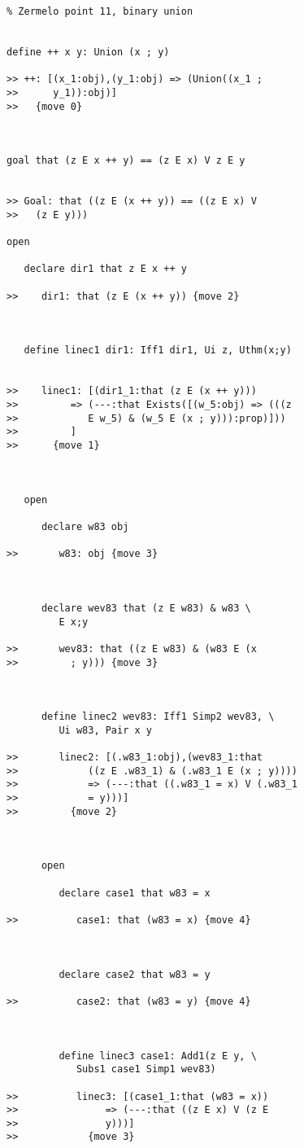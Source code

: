 \documentclass[12pt]{article}
\begin{document}
\begin{verbatim}
% Zermelo point 11, binary union


define ++ x y: Union (x ; y)

>> ++: [(x_1:obj),(y_1:obj) => (Union((x_1 ;
>>      y_1)):obj)]
>>   {move 0}



goal that (z E x ++ y) == (z E x) V z E y


>> Goal: that ((z E (x ++ y)) == ((z E x) V
>>   (z E y)))

open

   declare dir1 that z E x ++ y

>>    dir1: that (z E (x ++ y)) {move 2}



   define linec1 dir1: Iff1 dir1, Ui z, Uthm(x;y)


>>    linec1: [(dir1_1:that (z E (x ++ y)))
>>         => (---:that Exists([(w_5:obj) => (((z
>>            E w_5) & (w_5 E (x ; y))):prop)]))
>>         ]
>>      {move 1}



   open

      declare w83 obj

>>       w83: obj {move 3}



      declare wev83 that (z E w83) & w83 \
         E x;y

>>       wev83: that ((z E w83) & (w83 E (x
>>         ; y))) {move 3}



      define linec2 wev83: Iff1 Simp2 wev83, \
         Ui w83, Pair x y

>>       linec2: [(.w83_1:obj),(wev83_1:that
>>            ((z E .w83_1) & (.w83_1 E (x ; y))))
>>            => (---:that ((.w83_1 = x) V (.w83_1
>>            = y)))]
>>         {move 2}



      open

         declare case1 that w83 = x

>>          case1: that (w83 = x) {move 4}



         declare case2 that w83 = y

>>          case2: that (w83 = y) {move 4}



         define linec3 case1: Add1(z E y, \
            Subs1 case1 Simp1 wev83)

>>          linec3: [(case1_1:that (w83 = x))
>>               => (---:that ((z E x) V (z E
>>               y)))]
>>            {move 3}




\end{verbatim}
\end{document}
